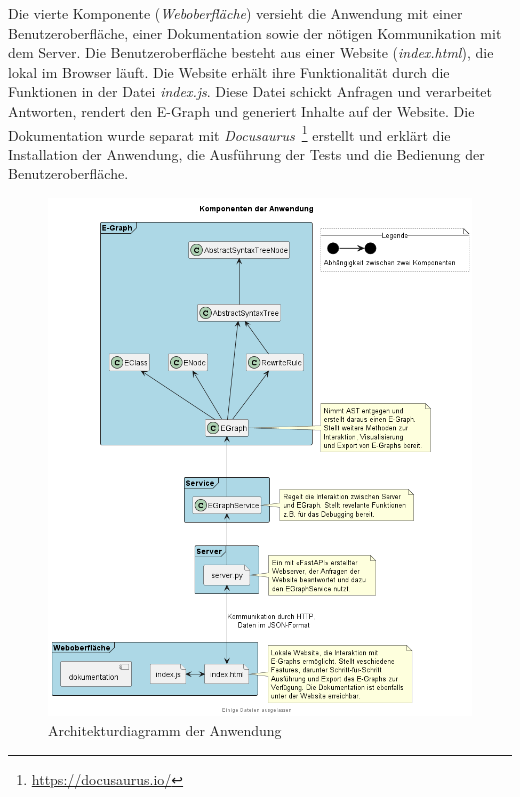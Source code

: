 
Die vierte Komponente (\textit{Weboberfläche}) versieht die Anwendung mit einer Benutzeroberfläche, einer Dokumentation sowie der nötigen Kommunikation mit dem Server.
Die Benutzeroberfläche besteht aus einer Website (\textit{index.html}), die lokal im Browser läuft. Die Website erhält ihre Funktionalität durch die Funktionen in der 
Datei \textit{index.js}. Diese Datei schickt Anfragen und verarbeitet Antworten, rendert den E-Graph und generiert Inhalte auf der Website. 
Die Dokumentation wurde separat mit \textit{Docusaurus}~\footnote{\hspace{1.5mm}\url{https://docusaurus.io/}} erstellt und erklärt die Installation der Anwendung, die Ausführung der Tests und die Bedienung der Benutzeroberfläche.  



\begin{figure}[H]
  \centering
  \includegraphics[scale=0.6]{../fig/components.png}
  \caption{Architekturdiagramm der Anwendung}
  \label{fig:architektur}
\end{figure}

